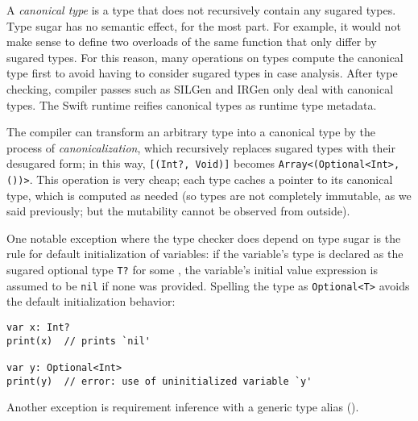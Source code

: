 \documentclass[../generics]{subfiles}
\begin{document}
A \emph{canonical type} is a type that does not recursively contain any sugared types. Type sugar has no semantic effect, for the most part. For example, it would not make sense to define two overloads of the same function that only differ by sugared types. For this reason, many operations on types compute the canonical type first to avoid having to consider sugared types in case analysis. After type checking, compiler passes such as SILGen and IRGen only deal with canonical types. The Swift runtime reifies canonical types as runtime type metadata.

The compiler can transform an arbitrary type into a canonical type by the process of \emph{canonicalization}, which recursively replaces sugared types with their desugared form; in this way, \texttt{[(Int?, Void)]} becomes \verb|Array<(Optional<Int>, ())>|. This operation is very cheap; each type caches a pointer to its canonical type, which is computed as needed (so types are not completely immutable, as we said previously; but the mutability cannot be observed from outside).

One notable exception where the type checker does depend on type sugar is the rule for default initialization of variables: if the variable's type is declared as the sugared optional type \texttt{T?} for some \tT, the variable's initial value expression is assumed to be \texttt{nil} if none was provided. Spelling the type as \texttt{Optional<T>} avoids the default initialization behavior:
\begin{Verbatim}
var x: Int?
print(x)  // prints `nil'

var y: Optional<Int>
print(y)  // error: use of uninitialized variable `y'
\end{Verbatim}

Another exception is requirement inference with a generic type alias ().
 
\end{document}
